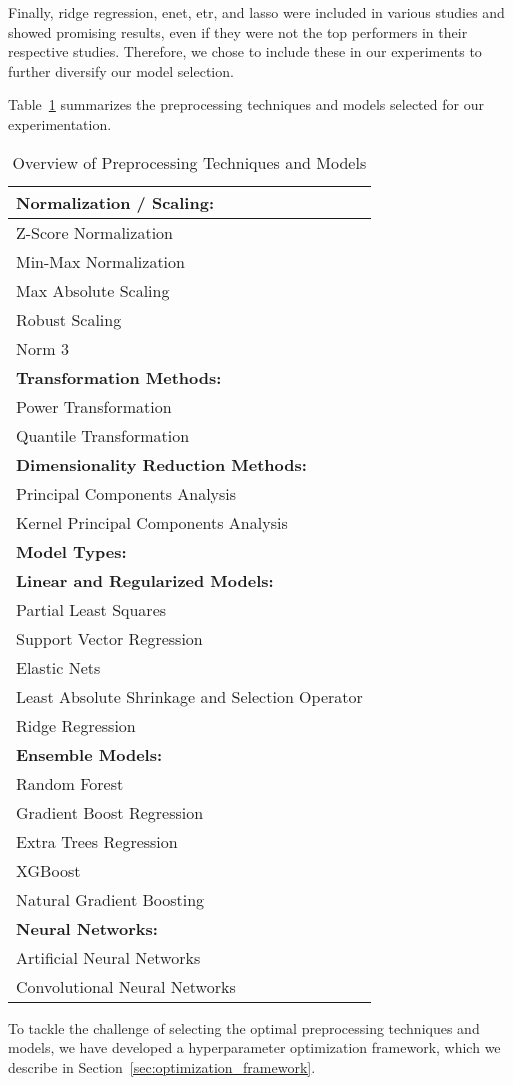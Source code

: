Finally, ridge regression, \gls{enet}, \gls{etr}, and \gls{lasso} were included in various studies and showed promising results, even if they were not the top performers in their respective studies.
Therefore, we chose to include these in our experiments to further diversify our model selection.

Table~\ref{tab:preprocessing-models} summarizes the preprocessing techniques and models selected for our experimentation.

\begin{table}[ht]
\centering
\begin{tabularx}{\columnwidth}{>{\raggedright\arraybackslash}X}
\toprule
\textbf{Normalization / Scaling:} \\
\midrule
Z-Score Normalization \\
Min-Max Normalization \\
Max Absolute Scaling \\
Robust Scaling \\
Norm 3 \\
\midrule
\textbf{Transformation Methods:} \\
\midrule
Power Transformation \\
Quantile Transformation \\
\midrule
\textbf{Dimensionality Reduction Methods:} \\
\midrule
Principal Components Analysis \\
Kernel Principal Components Analysis \\
\midrule
\textbf{Model Types:} \\
\midrule
\textbf{Linear and Regularized Models:} \\
\quad Partial Least Squares \\
\quad Support Vector Regression \\
\quad Elastic Nets \\
\quad Least Absolute Shrinkage and Selection Operator \\
\quad Ridge Regression \\
\textbf{Ensemble Models:} \\
\quad Random Forest \\
\quad Gradient Boost Regression \\
\quad Extra Trees Regression \\
\quad XGBoost \\
\quad Natural Gradient Boosting \\
\textbf{Neural Networks:} \\
\quad Artificial Neural Networks \\
\quad Convolutional Neural Networks \\\bottomrule
\end{tabularx}
\caption{Overview of Preprocessing Techniques and Models}
\label{tab:preprocessing-models}
\end{table}

To tackle the challenge of selecting the optimal preprocessing techniques and models, we have developed a hyperparameter optimization framework, which we describe in Section~\ref{sec:optimization_framework}.